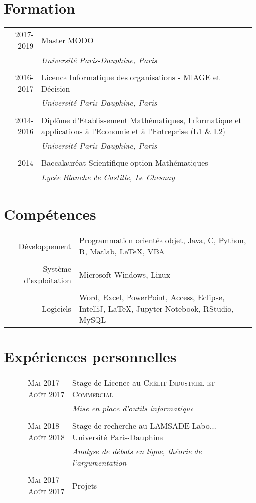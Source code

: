 \documentclass[a4paper,10pt]{article}
\begin{document}
\section{Formation}
\begin{tabular}{r|p{11cm}}
 \textsc{2017-2019} & Master MODO \\&\emph{\small{Université Paris-Dauphine, Paris}}\\\multicolumn{2}{c}{} \\
 \textsc{2016-2017} & Licence Informatique des organisations - MIAGE et Décision \\&\emph{\small{Université Paris-Dauphine, Paris}}\\\multicolumn{2}{c}{} \\
 \textsc{2014-2016} & Diplôme d'Etablissement Mathématiques, Informatique et applications à l'Economie et à l'Entreprise (L1 \& L2) \\&\emph{\small{Université Paris-Dauphine, Paris}}\\\multicolumn{2}{c}{} \\
 \textsc{2014} & Baccalauréat Scientifique option Mathématiques \\&\emph{\small{Lycée Blanche de Castille, Le Chesnay}}\\
\end{tabular}

\section{Compétences}
\begin{tabular}{rl}	
 Développement & Programmation orientée objet, Java, C, Python, R, Matlab, \LaTeX, VBA\\&\\
Système d'exploitation & Microsoft Windows, Linux\\&\\
Logiciels & Word, Excel, PowerPoint, Access, Eclipse, IntelliJ, LaTeX, Jupyter Notebook, RStudio, MySQL
\end{tabular}

\section{Expériences personnelles}
\begin{tabular}{rl}	
 \textsc{Mai} 2017 - \textsc{Août} 2017 & Stage de Licence au \textsc{Crédit Industriel et Commercial}\\&
 \emph{\small{Mise en place d'outils informatique}}\\&\\
 \textsc{Mai} 2018 - \textsc{Août} 2018 & Stage de recherche au \textsc{LAMSADE} Labo... Université Paris-Dauphine\\&
 \emph{\small{Analyse de débats en ligne, théorie de l'argumentation}}\\&\\
 \textsc{Mai} 2017 - \textsc{Août} 2017 & Projets
\end{tabular}
\end{document}

